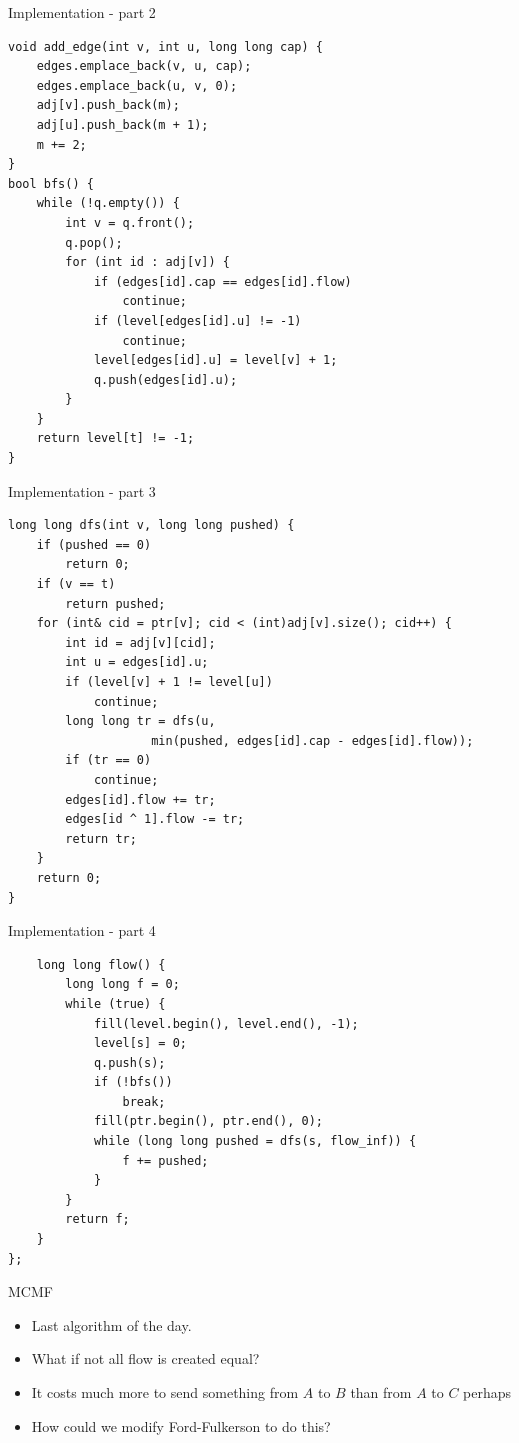 \documentclass{beamer}
\begin{document}
	\begin{frame}{Implementation - part 2}
		\begin{scriptsize}
			\begin{verbatim}
void add_edge(int v, int u, long long cap) {
	edges.emplace_back(v, u, cap);
	edges.emplace_back(u, v, 0);
	adj[v].push_back(m);
	adj[u].push_back(m + 1);
	m += 2;
}
bool bfs() {
	while (!q.empty()) {
		int v = q.front();
		q.pop();
		for (int id : adj[v]) {
			if (edges[id].cap == edges[id].flow)
			    continue;
			if (level[edges[id].u] != -1)
			    continue;
			level[edges[id].u] = level[v] + 1;
			q.push(edges[id].u);
		}
	}
	return level[t] != -1;
}
				\end{verbatim}
			\end{scriptsize}
		\end{frame}
		
	\begin{frame}{Implementation - part 3}
		\begin{scriptsize}
			\begin{verbatim}
long long dfs(int v, long long pushed) {
	if (pushed == 0)
	    return 0;
	if (v == t)
	    return pushed;
	for (int& cid = ptr[v]; cid < (int)adj[v].size(); cid++) {
		int id = adj[v][cid];
		int u = edges[id].u;
		if (level[v] + 1 != level[u])
		    continue;
		long long tr = dfs(u, 
                    min(pushed, edges[id].cap - edges[id].flow));
		if (tr == 0)
		    continue;
		edges[id].flow += tr;
		edges[id ^ 1].flow -= tr;
		return tr;
	}
	return 0;
}
			\end{verbatim}
		\end{scriptsize}
	\end{frame}
	
	\begin{frame}{Implementation - part 4}
		\begin{scriptsize}
			\begin{verbatim}
	long long flow() {
		long long f = 0;
		while (true) {
			fill(level.begin(), level.end(), -1);
			level[s] = 0;
			q.push(s);
			if (!bfs())
			    break;
			fill(ptr.begin(), ptr.end(), 0);
			while (long long pushed = dfs(s, flow_inf)) {
				f += pushed;
			}
		}
		return f;
	}
};
			\end{verbatim}
		\end{scriptsize}
	\end{frame}
	
	\begin{frame}[plain]{MCMF}
		\begin{itemize}
			\item Last algorithm of the day.
			\item What if not all flow is created equal?
			\item It costs much more to send something from $A$ to $B$ than from $A$ to $C$ perhaps
			\item How could we modify Ford-Fulkerson to do this?
		\end{itemize}
	\end{frame}
	
\end{document}

